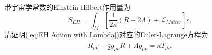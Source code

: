         \begin{exercise}
            带宇宙学常数的Einstein-Hilbert作用量为
            \begin{equation}\label{eq:EH Action with Lambda}
                S_{EH}=\int_M\left[\frac{1}{2\kappa}\left(R-2\Lambda\right)+\mathcal{L} _{Matter}\right]\epsilon,
            \end{equation}
            请证明(\ref{eq:EH Action with Lambda})对应的Euler-Lagrange方程为
            \begin{eqnarray}\label{eq:Field Equation with Lambda}
                R_{\mu\nu}-\frac{1}{2}g_{\mu\nu}R+\Lambda g_{\mu\nu}=\kappa T_{\mu\nu}.
            \end{eqnarray}
        \end{exercise}